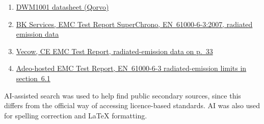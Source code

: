 \begin{enumerate}
  \item \label{ref:dwm1001-datasheet} \href{https://store.qorvo.com/datasheets/qorvo/dwm1001datasheet.pdf}{DWM1001 datasheet (Qorvo)}
  \item \label{ref:bk-superchrono} \href{https://www.steinertsensingsystems.com/wp-content/uploads/2013/06/Certificate-of-Compliance-CE-FCC-SuperChrono-1.pdf}{BK Services, EMC Test Report SuperChrono, EN~61000-6-3:2007, radiated emission data}
  \item \label{ref:vecow-ce-emc} \href{https://www.vecow.com/dispUploadBox/PJ-VECOW/Files/10276.pdf}{Vecow, CE EMC Test Report, radiated-emission data on p.~33}
  \item \label{ref:adeo-emc} \href{https://media.adeo.com/media/1320160/media.pdf}{Adeo-hosted EMC Test Report, EN~61000-6-3 radiated-emission limits in section~6.1}
\end{enumerate}

AI-assisted search was used to help find public secondary sources, since this differs from
the official way of accessing licence-based standards. AI was also used for spelling
correction and LaTeX formatting.
